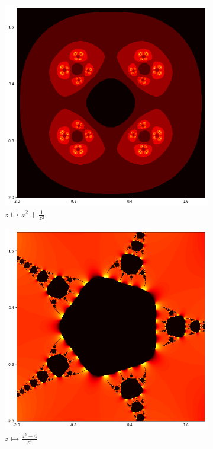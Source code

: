 \documentclass{amsart}
\theoremstyle{definition}
\theoremstyle{remark}
\numberwithin{equation}{section}
\begin{document}
\begin{figure}[h]
\centering
\begin{subfigure}{.32\textwidth}
  \centering
  \includegraphics[width=.8\linewidth]{Juliaz2pluszneg2.png}
  \caption{$z\mapsto z^2+\frac{1}{z^2}$}
\end{subfigure}%
\begin{subfigure}{.32\textwidth}
  \centering
  \includegraphics[width=.8\linewidth]{Juliaz5-4dividez4.png}
  \caption{$z\mapsto \frac{z^5-4}{z^4}$}
\end{subfigure}
\begin{subfigure}{.32\textwidth}
  \centering

\end{subfigure}
\end{figure}
\end{document}
